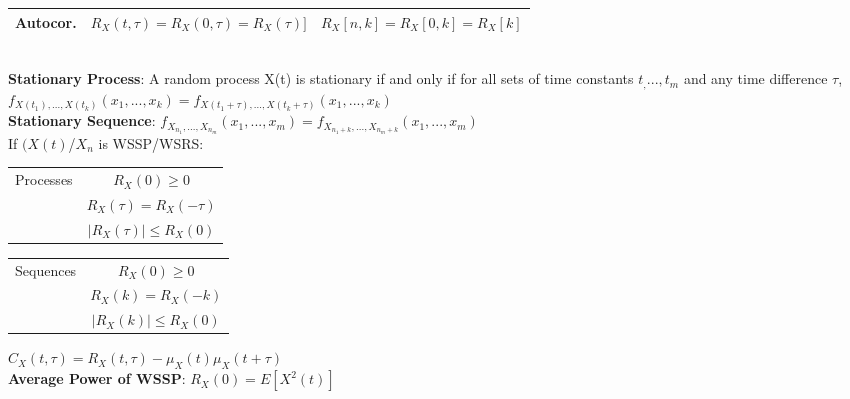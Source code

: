 \documentclass{article}
\begin{document}
\begin{vwcol}[widths={0.63}, sep=.4cm, justify=flush,rule=0pt]
\begin{tabular}{|c|c|c|}
		\hline
		Autocor. & $R_X(t, \tau) = R_X(0, \tau) = R_X(\tau)]$ & $R_X[n, k] = R_X[0, k] = R_X[k]$\\
		\hline
	\end{tabular}\\
	\textbf{Stationary Process}: A random process X(t) is stationary if and only if for all sets of time constants $t_, ... , t_m$ and any time difference $\tau$,  $f_{X(t_1),... ,  X(t_k)}(x_1, ..., x_k) = f_{X(t_1 +\tau),... ,  X(t_k + \tau)}(x_1, ..., x_k)$
	\\
	\textbf{Stationary Sequence}: $f_{X_{n_1},... ,  X_{n_m}}(x_1, ..., x_m) = f_{X_{n_1 + k},... ,  X_{n_m +k}}(x_1, ..., x_m)$\\
	If $(X(t)$/$X_n$ is WSSP/WSRS:\\
	\begin{tabular}{|c|c|}
		\hline
		Processes & $R_X(0) \geq 0$ \\ & $R_X(\tau) = R_X(-\tau)$ \\ & $\vert R_X(\tau) \vert \leq R_X(0)$ \\
		\hline  
	\end{tabular}
	\begin{tabular}{|c|c|}
		\hline
		Sequences & $R_X(0) \geq 0$ \\ & $R_X(k) = R_X(-k)$ \\ & $\vert R_X(k) \vert \leq R_X(0)$ \\
		\hline  
	\end{tabular}
    \end{vwcol}
	\begin{multicols}{2}
    $C_X(t, \tau) = R_X(t, \tau) -\mu_X(t)\mu_X(t + \tau)$\\
	\textbf{Average Power of WSSP}: $R_X(0) = E[X^2(t)]$
	\end{multicols}
\end{document}
